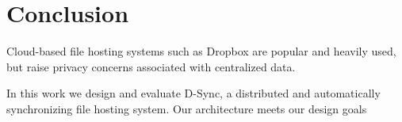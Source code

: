 \section{Conclusion}
\label{conclusion}
Cloud-based file hosting systems such as Dropbox
are popular and heavily used,
but raise privacy concerns associated with centralized data.

In this work we design and evaluate D-Sync,
a distributed and automatically synchronizing file hosting system.
Our architecture meets our design goals

